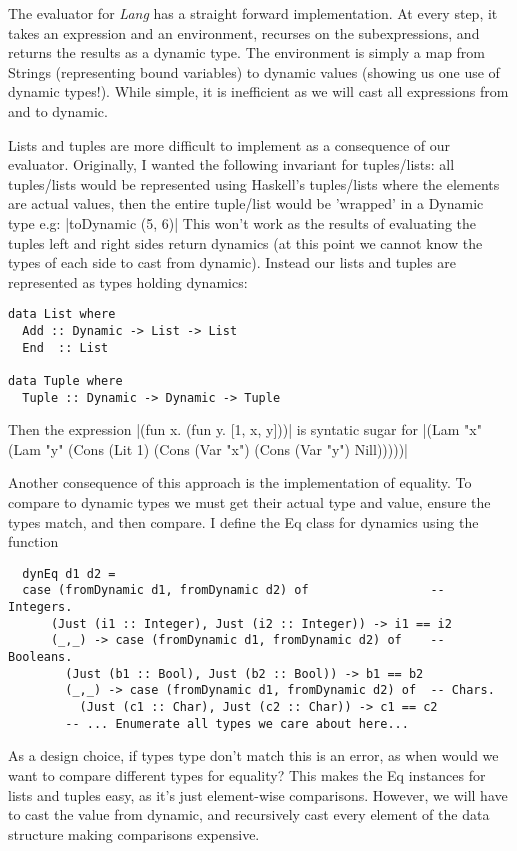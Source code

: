 \documentclass{article}
\begin{document}
The evaluator for \textit{Lang} has a straight forward implementation. At every step, it takes an expression and an environment, recurses on the subexpressions, and returns the results as a dynamic type. The environment is simply a map from Strings (representing bound variables) to dynamic values (showing us one use of dynamic types!). While simple, it is inefficient as we will cast all expressions from and to dynamic.

Lists and tuples are more difficult to implement as a consequence of our evaluator. Originally, I wanted the following invariant for tuples/lists: all tuples/lists would be represented using Haskell's tuples/lists where the elements are actual values, then the entire tuple/list would be 'wrapped' in a Dynamic type e.g: |toDynamic (5, 6)| This won't work as the results of evaluating the tuples left and right sides return dynamics (at this point we cannot know the types of each side to cast from dynamic). Instead our lists and tuples are represented as types holding dynamics:

\begin{verbatim}
data List where
  Add :: Dynamic -> List -> List
  End  :: List

data Tuple where
  Tuple :: Dynamic -> Dynamic -> Tuple
\end{verbatim}
Then the expression |(fun x. (fun y. [1, x, y]))| is syntatic sugar for |(Lam "x" (Lam "y" (Cons (Lit 1) (Cons (Var "x") (Cons (Var "y") Nill)))))|

Another consequence of this approach is the implementation of equality. To compare to dynamic types we must get their actual type and value, ensure the types match, and then compare. I define the Eq class for dynamics using the function
\begin{verbatim}
  dynEq d1 d2 =
  case (fromDynamic d1, fromDynamic d2) of                 -- Integers.
      (Just (i1 :: Integer), Just (i2 :: Integer)) -> i1 == i2
      (_,_) -> case (fromDynamic d1, fromDynamic d2) of    -- Booleans.
        (Just (b1 :: Bool), Just (b2 :: Bool)) -> b1 == b2
        (_,_) -> case (fromDynamic d1, fromDynamic d2) of  -- Chars.
          (Just (c1 :: Char), Just (c2 :: Char)) -> c1 == c2
        -- ... Enumerate all types we care about here...
\end{verbatim}
As a design choice, if types type don't match this is an error, as when would we want to compare different types for equality? This makes the Eq instances for lists and tuples easy, as it's just element-wise comparisons. However, we will have to cast the value from dynamic, and recursively cast every element of the data structure making comparisons expensive.
\end{document}
